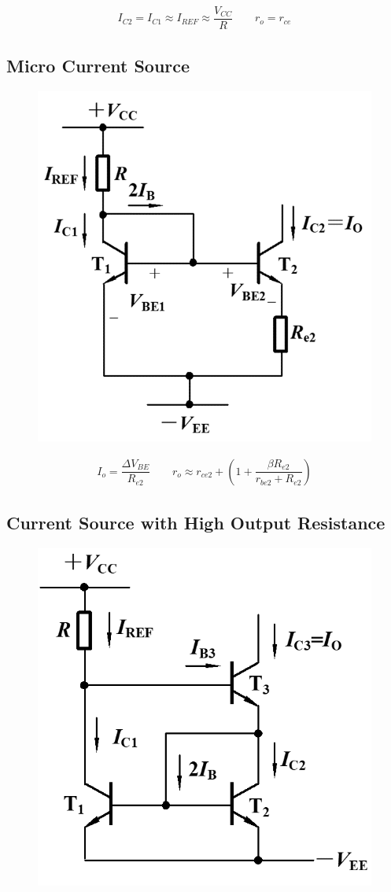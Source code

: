 \begin{equation*}
  \begin{aligned}
    I_{C2} = I_{C1} \approx I_{REF} \approx \dfrac{V_{CC}}{R} 
    \quad\quad 
    r_o = r_{ce}
  \end{aligned}
\end{equation*}

\subsection{Micro Current Source}

\begin{figure}[H]
  \centering
  \includegraphics[width=0.6\linewidth]{figures/Micro-Current-Source}
\end{figure}

\begin{equation*}
  \begin{aligned}
    I_o = \dfrac{\Delta V_{BE}}{R_{e2}} \quad\quad 
    r_o \approx r_{ce2} + \left( 1 + \dfrac{\beta R_{e2}}{r_{be2} + R_{e2}}  \right)
  \end{aligned}
\end{equation*}

\subsection{Current Source with High Output Resistance}

\begin{figure}[H]
  \centering
  \includegraphics[width=0.5\linewidth]{figures/High-Resistance-Current-Source}
\end{figure}

